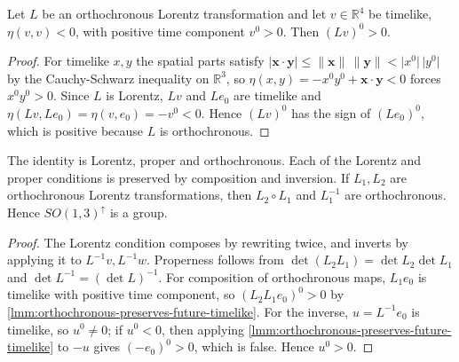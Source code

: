 \begin{lemma}
    \label{lmm:orthochronous-preserves-future-timelike}
    \leanok
    Let $L$ be an orthochronous Lorentz transformation and let $v \in \mathbb{R}^4$ be timelike, $\eta(v,v) < 0$, with positive time component $v^0 > 0$. Then $(Lv)^0 > 0$.
\end{lemma}
\begin{proof}
    \leanok
    For timelike $x, y$ the spatial parts satisfy $\lvert \mathbf{x}\cdot\mathbf{y}\rvert \le \lVert\mathbf{x}\rVert\,\lVert\mathbf{y}\rVert < \lvert x^0\rvert\,\lvert y^0\rvert$ by the Cauchy-Schwarz inequality on $\mathbb{R}^3$, so $\eta(x,y) = -x^0 y^0 + \mathbf{x}\cdot\mathbf{y} < 0$ forces $x^0 y^0 > 0$. Since $L$ is Lorentz, $Lv$ and $Le_0$ are timelike and $\eta(Lv, Le_0) = \eta(v, e_0) = -v^0 < 0$. Hence $(Lv)^0$ has the sign of $(Le_0)^0$, which is positive because $L$ is orthochronous.
\end{proof}

\begin{lemma}
    \label{lmm:lorentz-closure}
    \leanok
    The identity is Lorentz, proper and orthochronous. Each of the Lorentz and proper conditions is preserved by composition and inversion. If $L_1, L_2$ are orthochronous Lorentz transformations, then $L_2 \circ L_1$ and $L_1^{-1}$ are orthochronous. Hence $SO(1,3)^{\uparrow}$ is a group.
\end{lemma}
\begin{proof}
    \leanok
    The Lorentz condition composes by rewriting twice, and inverts by applying it to $L^{-1}v, L^{-1}w$. Properness follows from $\det(L_2 L_1) = \det L_2 \det L_1$ and $\det L^{-1} = (\det L)^{-1}$. For composition of orthochronous maps, $L_1 e_0$ is timelike with positive time component, so $(L_2 L_1 e_0)^0 > 0$ by \ref{lmm:orthochronous-preserves-future-timelike}. For the inverse, $u = L^{-1} e_0$ is timelike, so $u^0 \neq 0$; if $u^0 < 0$, then applying \ref{lmm:orthochronous-preserves-future-timelike} to $-u$ gives $(-e_0)^0 > 0$, which is false. Hence $u^0 > 0$.
\end{proof}

